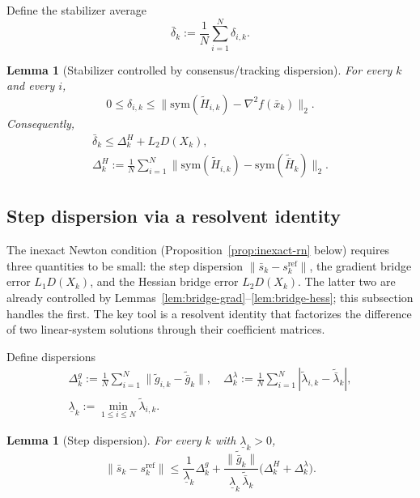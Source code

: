 \documentclass[11pt,a4paper]{article}
\newtheorem{lemma}[theorem]{Lemma}
\begin{document}
Define the stabilizer average
\[
\bar\delta_k:=\frac1N\sum_{i=1}^N \delta_{i,k}.
\]

\begin{lemma}[Stabilizer controlled by consensus/tracking dispersion]\label{lem:delta_control}
For every $k$ and every $i$,
\[
0\le \delta_{i,k}\le \big\|\mathrm{sym}(\tilde H_{i,k})-\nabla^2 f(\bar x_k)\big\|_2.
\]
Consequently,
\begin{gather*}
\bar\delta_k\le \Delta_k^H + L_2D(X_k),\\
\Delta_k^H:=\tfrac1N\!\sum_{i=1}^N\big\|\mathrm{sym}(\tilde H_{i,k})-\mathrm{sym}(\tilde{\bar H}_k)\big\|_2 .
\end{gather*}
\end{lemma}

\subsection{Step dispersion via a resolvent identity}\label{ssec:stepdisp}
The inexact Newton condition (Proposition~\ref{prop:inexact-rn} below)
requires three quantities to be small: the step dispersion
$\|\bar s_k - s_k^{\mathrm{ref}}\|$, the gradient bridge error
$L_1 D(X_k)$, and the Hessian bridge error $L_2 D(X_k)$.
The latter two are already controlled by
Lemmas~\ref{lem:bridge-grad}--\ref{lem:bridge-hess};
this subsection handles the first.
The key tool is a resolvent identity that factorizes the
difference of two linear-system solutions through their
coefficient matrices.

Define dispersions
\begin{gather*}
\Delta_k^g:=\tfrac1N\textstyle\sum_{i=1}^N \|\tilde g_{i,k}-\tilde{\bar g}_k\|,\quad
\Delta_k^\lambda:=\tfrac1N\textstyle\sum_{i=1}^N |\tilde\lambda_{i,k}-\tilde{\bar\lambda}_k|,\\
\underline\lambda_k:=\min_{1\le i\le N}\tilde\lambda_{i,k}.
\end{gather*}

\begin{lemma}[Step dispersion]\label{lem:step-disp}
For every $k$ with $\underline\lambda_k>0$,
\[
\|\bar s_k-s_k^{\mathrm{ref}}\|
\le \frac{1}{\underline\lambda_k}\Delta_k^g
+\frac{\|\tilde{\bar g}_k\|}{\underline\lambda_k\,\tilde{\bar\lambda}_k}\big(\Delta_k^H+\Delta_k^\lambda\big).
\]
\end{lemma}
\end{document}
